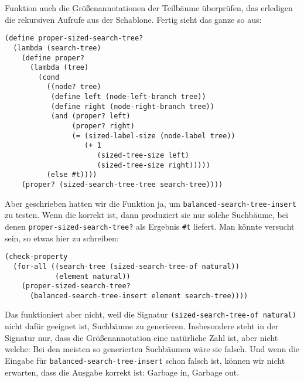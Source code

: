Funktion auch die Größenannotationen der Teilbäume überprüfen, das
erledigen die rekursiven Aufrufe aus der Schablone.  Fertig sieht das
ganze so aus:
%
\begin{lstlisting}
(define proper-sized-search-tree?
  (lambda (search-tree)
    (define proper?
      (lambda (tree)
        (cond
          ((node? tree)
           (define left (node-left-branch tree))
           (define right (node-right-branch tree))
           (and (proper? left)
                (proper? right)
                (= (sized-label-size (node-label tree))
                   (+ 1
                      (sized-tree-size left)
                      (sized-tree-size right)))))
          (else #t))))
    (proper? (sized-search-tree-tree search-tree))))
\end{lstlisting}
% 
Aber geschrieben hatten wir die Funktion ja, um
\lstinline{balanced-search-tree-insert} zu testen.  Wenn die korrekt
ist, dann produziert sie nur solche Suchbäume, bei denen
\lstinline{proper-sized-search-tree?} als Ergebnis \lstinline{#t}
liefert.  Man könnte versucht sein, so etwas hier zu schreiben:

\begin{lstlisting}
(check-property
  (for-all ((search-tree (sized-search-tree-of natural))
            (element natural))
    (proper-sized-search-tree?
      (balanced-search-tree-insert element search-tree))))
\end{lstlisting}
%
Das funktioniert aber nicht, weil die Signatur
\lstinline{(sized-search-tree-of natural)} nicht dafür geeignet ist,
Suchbäume zu generieren.  Insbesondere steht in der
Signatur nur, dass die Größenannotation eine natürliche Zahl ist, aber
nicht welche: Bei den meisten so generierten Suchbäumen wäre sie
falsch.  Und wenn die Eingabe für
\lstinline{balanced-search-tree-insert} schon falsch ist, können wir
nicht erwarten, dass die Ausgabe korrekt ist: Garbage in, Garbage out.

